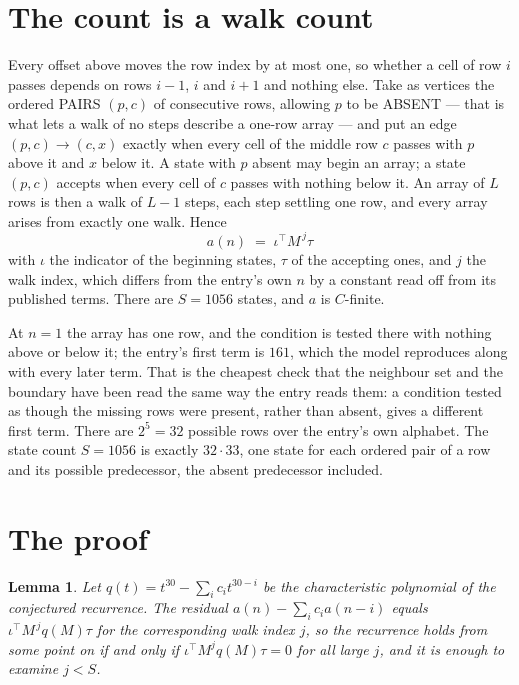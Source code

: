 \documentclass[11pt,a4paper]{article}
\theoremstyle{plain}
\newtheorem{lemma}[theorem]{Lemma}
\theoremstyle{definition}
\begin{document}
\section{The count is a walk count}

Every offset above moves the row index by at most one, so whether a cell of row $i$ passes
depends on rows $i-1$, $i$ and $i+1$ and nothing else. Take as vertices the ordered PAIRS
$(p,c)$ of consecutive rows, allowing $p$ to be ABSENT --- that is what lets a walk of no steps
describe a one-row array --- and put an edge $(p,c)\to(c,x)$ exactly when every cell of the
middle row $c$ passes with $p$ above it and $x$ below it. A state with $p$ absent may begin an
array; a state $(p,c)$ accepts when every cell of $c$ passes with nothing below it. An array of
$L$ rows is then a walk of $L-1$ steps, each step settling one row, and every array arises from
exactly one walk. Hence
\[
a(n)\;=\;\iota^{\!\top}M^{\,j}\tau
\]
with $\iota$ the indicator of the beginning states, $\tau$ of the accepting ones, and $j$ the
walk index, which differs from the entry's own $n$ by a constant read off from its published
terms. There are $S=1056$ states, and $a$ is $C$-finite.

At $n=1$ the array has one row, and
the condition is tested there with nothing above or below it; the entry's first term is
$161$, which the model reproduces along with every later term. That is the cheapest check
that the neighbour set and the boundary have been read the same way the entry reads them: a
condition tested as though the missing rows were present, rather than absent, gives a different
first term. There are $2^{5}=32$ possible rows over the entry's own alphabet. The state count $S=1056$ is exactly $32\cdot33$,
one state for each ordered pair of a row and its possible predecessor, the absent predecessor
included.

\section{The proof}

\begin{lemma}\label{lem:crit}
Let $q(t)=t^{30}-\sum_i c_it^{30-i}$ be the characteristic polynomial of the
conjectured recurrence. The residual $a(n)-\sum_ic_ia(n-i)$ equals
$\iota^{\!\top}M^{\,j}q(M)\tau$ for the corresponding walk index $j$, so the recurrence
holds from some point on if and only if $\iota^{\!\top}M^{j}q(M)\tau=0$ for all large $j$,
and it is enough to examine $j<S$.
\end{lemma}
\end{document}
